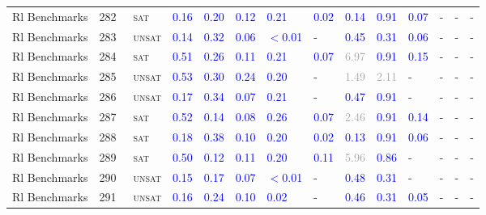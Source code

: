 \begin{center}
{\begin{longtable}{@{}llllllllllllll@{}}
Rl Benchmarks & 282 & ~\textsc{sat} & \textcolor{blue}{0.16} & \textcolor{blue}{0.20} & \textcolor{blue}{0.12} & \textcolor{blue}{0.21} & \textcolor{blue}{0.02} & \textcolor{blue}{0.14} & \textcolor{blue}{0.91} & \textcolor{blue}{0.07} & - & - & - \\
Rl Benchmarks & 283 & ~\textsc{unsat} & \textcolor{blue}{0.14} & \textcolor{blue}{0.32} & \textcolor{blue}{0.06} & \textcolor{blue}{$<$0.01} & - & \textcolor{blue}{0.45} & \textcolor{blue}{0.31} & \textcolor{blue}{0.06} & - & - & - \\
Rl Benchmarks & 284 & ~\textsc{sat} & \textcolor{blue}{0.51} & \textcolor{blue}{0.26} & \textcolor{blue}{0.11} & \textcolor{blue}{0.21} & \textcolor{blue}{0.07} & \textcolor{darkgray}{6.97} & \textcolor{blue}{0.91} & \textcolor{blue}{0.15} & - & - & - \\
Rl Benchmarks & 285 & ~\textsc{unsat} & \textcolor{blue}{0.53} & \textcolor{blue}{0.30} & \textcolor{blue}{0.24} & \textcolor{blue}{0.20} & - & \textcolor{darkgray}{1.49} & \textcolor{darkgray}{2.11} & - & - & - & - \\
Rl Benchmarks & 286 & ~\textsc{unsat} & \textcolor{blue}{0.17} & \textcolor{blue}{0.34} & \textcolor{blue}{0.07} & \textcolor{blue}{0.21} & - & \textcolor{blue}{0.47} & \textcolor{blue}{0.91} & - & - & - & - \\
Rl Benchmarks & 287 & ~\textsc{sat} & \textcolor{blue}{0.52} & \textcolor{blue}{0.14} & \textcolor{blue}{0.08} & \textcolor{blue}{0.26} & \textcolor{blue}{0.07} & \textcolor{darkgray}{2.46} & \textcolor{blue}{0.91} & \textcolor{blue}{0.14} & - & - & - \\
Rl Benchmarks & 288 & ~\textsc{sat} & \textcolor{blue}{0.18} & \textcolor{blue}{0.38} & \textcolor{blue}{0.10} & \textcolor{blue}{0.20} & \textcolor{blue}{0.02} & \textcolor{blue}{0.13} & \textcolor{blue}{0.91} & \textcolor{blue}{0.06} & - & - & - \\
Rl Benchmarks & 289 & ~\textsc{sat} & \textcolor{blue}{0.50} & \textcolor{blue}{0.12} & \textcolor{blue}{0.11} & \textcolor{blue}{0.20} & \textcolor{blue}{0.11} & \textcolor{darkgray}{5.96} & \textcolor{blue}{0.86} & - & - & - & - \\
Rl Benchmarks & 290 & ~\textsc{unsat} & \textcolor{blue}{0.15} & \textcolor{blue}{0.17} & \textcolor{blue}{0.07} & \textcolor{blue}{$<$0.01} & - & \textcolor{blue}{0.48} & \textcolor{blue}{0.31} & - & - & - & - \\
Rl Benchmarks & 291 & ~\textsc{unsat} & \textcolor{blue}{0.16} & \textcolor{blue}{0.24} & \textcolor{blue}{0.10} & \textcolor{blue}{0.02} & - & \textcolor{blue}{0.46} & \textcolor{blue}{0.31} & \textcolor{blue}{0.05} & - & - & - \\

\end{longtable}}
\end{center}
